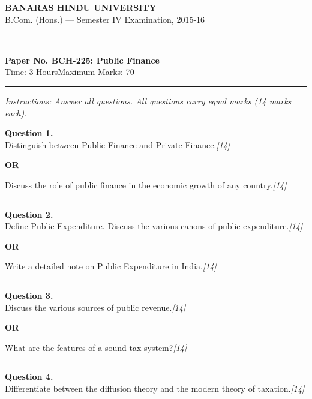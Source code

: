 \documentclass[11pt,a4paper]{article}
\newcommand{\pts}[1]{\hfill   \textit{[#1]}}
\begin{document}
\begin{center}
  {\large\bfseries BANARAS HINDU UNIVERSITY}\\[2pt]
  {\normalsize B.Com. (Hons.) --- Semester IV Examination, 2015-16}\\[6pt]
  \rule{0.8\linewidth}{0.5pt}\\[6pt]
  {\large\bfseries Paper No. BCH-225: Public Finance}\\[4pt]
  {\normalsize Time: 3 Hours\hfill Maximum Marks: 70}
\end{center}

\rule{\linewidth}{0.4pt}

\smallskip



\noindent   \textit{Instructions: Answer all questions. All questions carry equal marks (14 marks each).}

\bigskip




\noindent   \textbf{Question 1.} \\
Distinguish between Public Finance and Private Finance.\pts{14}

\centerline{   \textbf{OR}}

Discuss the role of public finance in the economic growth of any country.\pts{14}

\medskip\rule{\linewidth}{0.2pt}




\noindent   \textbf{Question 2.} \\
Define Public Expenditure. Discuss the various canons of public expenditure.\pts{14}

\centerline{   \textbf{OR}}

Write a detailed note on Public Expenditure in India.\pts{14}

\medskip\rule{\linewidth}{0.2pt}

\pagebreak




\noindent   \textbf{Question 3.} \\
Discuss the various sources of public revenue.\pts{14}

\centerline{   \textbf{OR}}

What are the features of a sound tax system?\pts{14}

\medskip\rule{\linewidth}{0.2pt}




\noindent   \textbf{Question 4.} \\
Differentiate between the diffusion theory and the modern theory of taxation.\pts{14}
\end{document}
